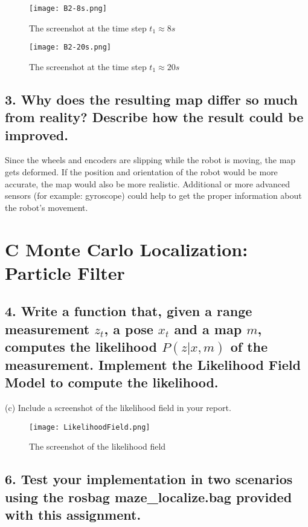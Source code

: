\documentclass[a4paper,10pt]{article}
\begin{document}
\begin{figure}[H]
	\centering
	\texttt{[image: B2-8s.png]}
	\caption{The screenshot at the time step $t_{1}\approx 8s$}
\end{figure}

\begin{figure}[H]
	\centering
	\texttt{[image: B2-20s.png]}
	\caption{The screenshot at the time step $t_{1}\approx 20s$}
\end{figure}


\subsection*{3. Why does the resulting map differ so much from reality? Describe how the result could be improved.}

Since the wheels and encoders are slipping while the robot is moving, the map gets deformed. If the position and orientation of the robot would be more accurate, the map would also be more realistic.
Additional or more advanced sensors (for example: gyroscope) could help to get the proper information about the robot’s movement.


\section*{C Monte Carlo Localization: Particle Filter}

\subsection*{4. Write a function that, given a range measurement $z_{t}$, a pose $x_{t}$ and a map $m$, computes the likelihood $P(z | x, m)$ of the measurement. Implement the Likelihood Field Model to compute the likelihood. }

(c) Include a screenshot of the likelihood field in your report.

\begin{figure}[htb]
	\centering
	\texttt{[image: LikelihoodField.png]}
	\caption{The screenshot of the likelihood field}
\end{figure}


\subsection*{6. Test your implementation in two scenarios using the rosbag \textbf{maze\_localize.bag} provided with this assignment.}
\end{document}
